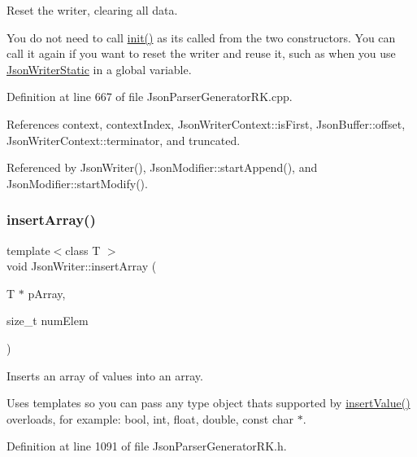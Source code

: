 Reset the writer, clearing all data. 

You do not need to call \hyperlink{class_json_writer_ad7dea044e659a5e1d368ff4628e9eea6}{init()} as it\textquotesingle{}s called from the two constructors. You can call it again if you want to reset the writer and reuse it, such as when you use \hyperlink{class_json_writer_static}{Json\+Writer\+Static} in a global variable. 

Definition at line 667 of file Json\+Parser\+Generator\+R\+K.\+cpp.



References context, context\+Index, Json\+Writer\+Context\+::is\+First, Json\+Buffer\+::offset, Json\+Writer\+Context\+::terminator, and truncated.



Referenced by Json\+Writer(), Json\+Modifier\+::start\+Append(), and Json\+Modifier\+::start\+Modify().

\mbox{\label{class_json_writer_a25d0c8b482f4a9a9dac6c0f339b3595f}} 
\subsubsection{\texorpdfstring{insert\+Array()}{insertArray()}}
{\footnotesize\ttfamily template$<$class T $>$ \\
void Json\+Writer\+::insert\+Array (\begin{DoxyParamCaption}\item[{T $\ast$}]{p\+Array,  }\item[{size\+\_\+t}]{num\+Elem }\end{DoxyParamCaption})\hspace{0.3cm}{\ttfamily [inline]}}



Inserts an array of values into an array. 

Uses templates so you can pass any type object that\textquotesingle{}s supported by \hyperlink{class_json_writer_ac58734c238ba7be066838591b0cc7743}{insert\+Value()} overloads, for example\+: bool, int, float, double, const char $\ast$. 

Definition at line 1091 of file Json\+Parser\+Generator\+R\+K.\+h.

\mbox{\label{class_json_writer_a8b4dc6726b66b4f277c7674e60c8a057}} 
